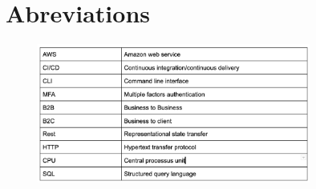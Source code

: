 \documentclass[
11pt, %
french, %
singlespacing, %
headsepline, %
]{MastersDoctoralThesis} %
\begin{document}
\tableofcontents %

\listoffigures %


\chapter*{Abreviations}

 \begin{figure}[H]
            \centering
                \includegraphics[width=0.8\textwidth]{Figures/abrevia}
	       \decoRule
	\label{fig:Abreviations}
\end{figure}






\end{document}
